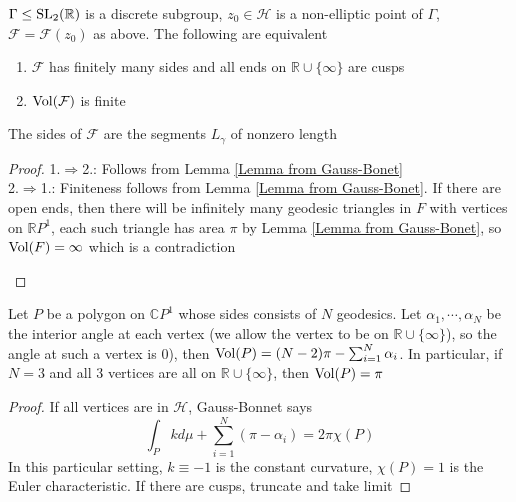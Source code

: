 \documentclass[main]{subfiles}
\begin{document}
\begin{theorem}
$\Gamma\leq\operatorname{SL}_2(\mathbb R)$ is a discrete subgroup, $z_0\in\mathcal H$ is a non-elliptic point of $\Gamma$, $\mathcal F=\mathcal F(z_0)$ as above. The following are equivalent
\begin{enumerate}
\item $\mathcal F$ has finitely many sides and all ends on $\mathbb R\cup\{\infty\}$ are cusps
\item $\operatorname{Vol}(\mathcal F)$ is finite
\end{enumerate}
\end{theorem}

\begin{note}
The sides of $\mathcal F$ are the segments $L_\gamma$ of nonzero length
\end{note}

\begin{proof}
1.$\Rightarrow$2.: Follows from Lemma \ref{Lemma from Gauss-Bonet} \\
2.$\Rightarrow$1.: Finiteness follows from Lemma \ref{Lemma from Gauss-Bonet}. If there are open ends, then there will be infinitely many geodesic triangles in $F$ with vertices on $\mathbb RP^1$, each such triangle has area $\pi$ by Lemma \ref{Lemma from Gauss-Bonet}, so $\operatorname{Vol}(F)=\infty$ which is a contradiction
\begin{center}
\end{center}
\end{proof}

\begin{lemma}\label{Lemma from Gauss-Bonet}
Let $P$ be a polygon on $\mathbb CP^1$ whose sides consists of $N$ geodesics. Let $\alpha_1,\cdots,\alpha_N$ be the interior angle at each vertex (we allow the vertex to be on $\mathbb R\cup\{\infty\}$), so the angle at such a vertex is 0), then $\operatorname{Vol}(P)=(N-2)\pi-\sum_{i=1}^N\alpha_i$. In particular, if $N=3$ and all 3 vertices are all on $\mathbb R\cup\{\infty\}$, then $\operatorname{Vol}(P)=\pi$
\end{lemma}

\begin{proof}
If all vertices are in $\mathcal H$, Gauss-Bonnet says
\[\int_Pkd\mu+\sum_{i=1}^N(\pi-\alpha_i)=2\pi\chi(P)\]
In this particular setting, $k\equiv-1$ is the constant curvature, $\chi(P)=1$ is the Euler characteristic. If there are cusps, truncate and take limit
\end{proof}
\end{document}
